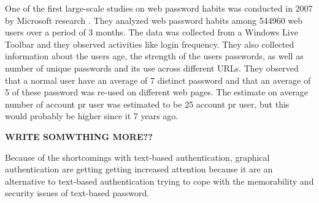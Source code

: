   One of the first large-scale studies on web password habits was conducted in 2007 by Microsoft research \cite{habits1}. They analyzed web password habits among 544960 web users over a period of 3 months. The data was collected from a Windows Live Toolbar and they observed activities like login frequency. They also collected information about the users age, the strength of the users passwords, as well as number of unique passwords and its use across different URLs. They observed that a normal user have an average of 7 distinct password and that an average of 5 of these password was re-used on different web pages. The estimate on average number of account pr user was estimated to be 25 account pr user, but this would probably be higher since it 7 years ago. 

  {\color{red} \bf WRITE SOMWTHING MORE??}

  Because of the shortcomings with text-based authentication, graphical authentication are getting getting increased attention because it are an alternative to text-based authentication trying to cope with the memorability and security issues of text-based password.
   
